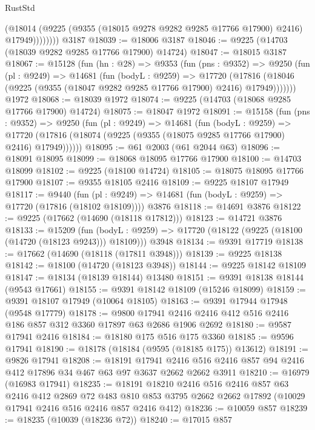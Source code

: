 \begin{lexlean}{RustStd}
\begin{coremodule}
                (@18014 (@9225 (@9355 (@18015 @9278 @9282 @9285 @17766 @17900) @2416) @17949))))))))
    @3187
@18039 := @18006 @3187
@18046 := @9225 (@14703 (@18039 @9282 @9285 @17766 @17900) @14724)
@18047 := @18015 @3187
@18067 := @15128
    (fun (hn : @28) =>
    @9353
      (fun (pns : @9352) =>
      @9250
        (fun (pl : @9249) =>
        @14681
          (fun (bodyL : @9259) =>
          @17720
            (@17816 (@18046 (@9225 (@9355 (@18047 @9282 @9285 @17766 @17900) @2416) @17949)))))))
    @1972
@18068 := @18039 @1972
@18074 := @9225 (@14703 (@18068 @9285 @17766 @17900) @14724)
@18075 := @18047 @1972
@18091 := @15158
    (fun (pns : @9352) =>
    @9250
      (fun (pl : @9249) =>
      @14681
        (fun (bodyL : @9259) =>
        @17720 (@17816 (@18074 (@9225 (@9355 (@18075 @9285 @17766 @17900) @2416) @17949))))))
@18095 := @61 @2003 (@61 @2044 @63)
@18096 := @18091 @18095
@18099 := @18068 @18095 @17766 @17900
@18100 := @14703 @18099
@18102 := @9225 (@18100 @14724)
@18105 := @18075 @18095 @17766 @17900
@18107 := @9355 @18105 @2416
@18109 := @9225 @18107 @17949
@18117 := @9440
    (fun (pl : @9249) => @14681 (fun (bodyL : @9259) => @17720 (@17816 (@18102 @18109))))
    @3876
@18118 := @14691 @3876
@18122 := @9225 (@17662 (@14690 (@18118 @17812)))
@18123 := @14721 @3876
@18133 := @15209
    (fun (bodyL : @9259) => @17720 (@18122 (@9225 (@18100 (@14720 (@18123 @9243))) @18109)))
    @3948
@18134 := @9391 @17719
@18138 := @17662 (@14690 (@18118 (@17811 @3948)))
@18139 := @9225 @18138
@18142 := @18100 (@14720 (@18123 @3948))
@18144 := @9225 @18142 @18109
@18147 := @18134 (@18139 @18144) @13480
@18151 := @9391 @18138 @18144 (@9543 @17661)
@18155 := @9391 @18142 @18109 (@15246 @18099)
@18159 := @9391 @18107 @17949 (@10064 @18105)
@18163 := @9391 @17944 @17948 (@9548 @17779)
@18178 := @9800 @17941 @2416 @2416 @412 @516 @2416 @186 @857 @312 @3360 @17897 @63 @2686 @1906 @2692
@18180 := @9587 @17941 @2416
@18184 := @18180 @175 @516 @175 @3360
@18185 := @9596 @17941
@18190 := @18178 (@18184 (@9595 (@18185 @175)) @13612)
@18191 := @9826 @17941
@18208 := @18191
    @17941
    @2416
    @516
    @2416
    @857
    @94
    @2416
    @412
    @17896
    @34
    @467
    @63
    @97
    @3637
    @2662
    @2662
    @3911
@18210 := @16979 (@16983 @17941)
@18235 := @18191
    @18210
    @2416
    @516
    @2416
    @857
    @63
    @2416
    @412
    @2869
    @72
    @483
    @810
    @853
    @3795
    @2662
    @2662
    @17892
    (@10029 @17941 @2416 @516 @2416 @857 @2416 @412)
@18236 := @10059 @857
@18239 := @18235 (@10039 (@18236 @72))
@18240 := @17015 @857

\end{coremodule}
\end{lexlean}
